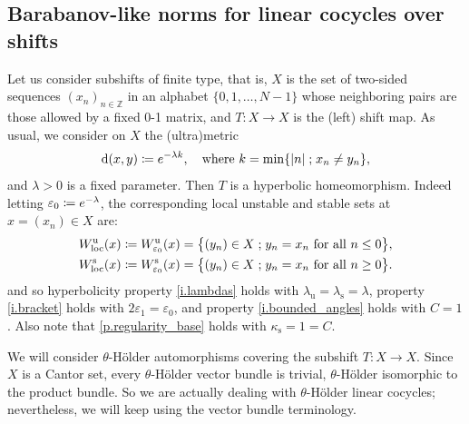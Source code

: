 \documentclass[10pt]{amsart}
\def\vcentcolon{\mathrel{\mathop\ordinarycolon}}
\providecommand\ordinarycolon{:}
\providecommand*\coloneqq{\vcentcolon\mathrel{\mkern-1.2mu}=}
\theoremstyle{plain}
\theoremstyle{definition}
\newcommand{\ZZ}{\mathbb{Z}}
\newcommand{\st}{\;\mathord{;}\;}
\newcommand{\dd}{\mathrm{d}}
\newcommand{\uu}{\mathrm{u}}
\renewcommand{\ss}{\mathrm{s}}
\let\epsilon\varepsilon
\begin{document}
\subsection{Barabanov-like norms for linear cocycles over shifts}\label{ss.Barabanov}

Let us consider subshifts of finite type, that is, $X$ is the set of two-sided sequences $(x_n)_{n\in \ZZ}$ in an alphabet $\{0,1,\dots, N-1\}$ whose neighboring pairs are those allowed by a fixed 0-1 matrix, and $T \colon X \to X$ is the (left) shift map.
As usual, we consider on $X$ the (ultra)metric
\begin{equation}\label{e.ultrametric}
\dd(x,y) \coloneqq e^{-\lambda k}, \quad \text{where } k = \min \{|n| \st x_n \neq y_n \},
\end{equation}
and $\lambda>0$ is a fixed parameter.
Then $T$ is a hyperbolic homeomorphism.
Indeed letting $\epsilon_0 \coloneqq e^{-\lambda}$, the corresponding local unstable and stable sets at $x=(x_n) \in X$ are:
\begin{align*}
W_\mathrm{loc}^\uu (x) &\coloneqq W_{\epsilon_0}^\uu (x) = \big\{ (y_n) \in X \st y_n = x_n \text{ for all } n\le 0\big\}, \\
W_\mathrm{loc}^\ss (x) &\coloneqq W_{\epsilon_0}^\ss (x) = \big\{ (y_n) \in X \st y_n = x_n \text{ for all } n\ge 0\big\}.
\end{align*}
and so hyperbolicity property \eqref{i.lambdas} holds with $\lambda_\uu = \lambda_\ss = \lambda$,
property \eqref{i.bracket} holds with $2\epsilon_1 = \epsilon_0$,
and property \eqref{i.bounded_angles} holds with $C=1$.
Also note that \cref{p.regularity_base} holds with $\kappa_\ss = 1 = C$.

We will consider $\theta$-Hölder automorphisms covering the subshift $T \colon X \to X$.
Since~$X$ is a Cantor set, every $\theta$-Hölder vector bundle is trivial, \ie $\theta$-Hölder isomorphic to the product bundle.
So we are actually dealing with $\theta$-Hölder linear cocycles; nevertheless, we will keep using the vector bundle terminology.
\end{document}
